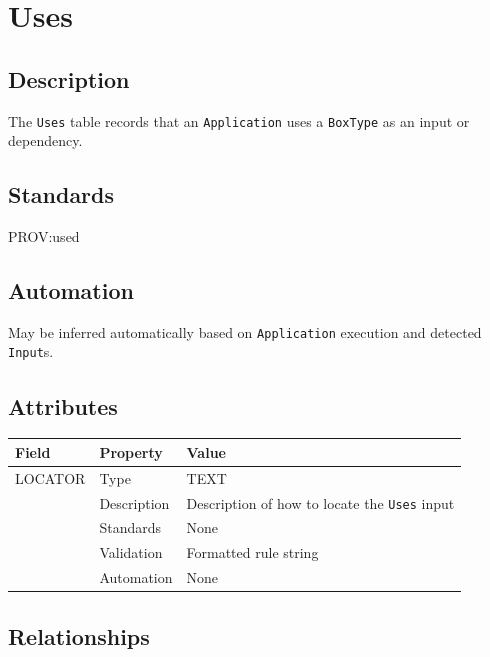 \documentclass[
]{article}
\newcounter{none} %
\begin{document}
\section{Uses}\label{uses}

\subsection{Description}\label{description-36}

The \texttt{Uses} table records that an \texttt{Application} uses a
\texttt{BoxType} as an input or dependency.

\subsection{Standards}\label{standards-38}

PROV:used

\subsection{Automation}\label{automation-38}

May be inferred automatically based on \texttt{Application} execution
and detected \texttt{Input}s.

\subsection{Attributes}\label{attributes-32}

{\def\LTcaptype{none} %
\begin{longtable}[]{@{}lll@{}}
\toprule\noalign{}
Field & Property & Value \\
\midrule\noalign{}
\endhead
\bottomrule\noalign{}
\endlastfoot
LOCATOR & Type & TEXT \\
& Description & Description of how to locate the \texttt{Uses} input \\
& Standards & None \\
& Validation & Formatted rule string \\
& Automation & None \\
\end{longtable}
}

\subsection{Relationships}\label{relationships-31}
\end{document}
